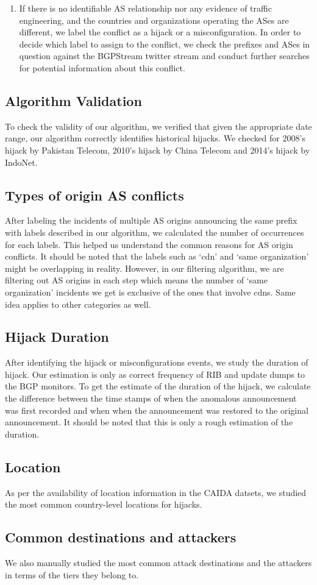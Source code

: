 \begin{enumerate}
\item If there is no identifiable AS relationship nor any evidence of traffic engineering, and the countries and organizations operating the ASes are different, we label the conflict as a hijack or a misconfiguration. In order to decide which label to assign to the conflict, we check the prefixes and ASes in question against the BGPStream twitter stream and conduct further searches for potential information about this conflict.
\end{enumerate}
\subsection{Algorithm Validation}
To check the validity of our algorithm, we verified that given the appropriate date range, our algorithm correctly identifies historical hijacks. We checked for 2008's hijack by Pakistan Telecom, 2010's hijack by China Telecom and 2014's hijack by IndoNet. 
\subsection{Types of origin AS conflicts}
After labeling the incidents of multiple AS origins announcing the same prefix with labels described in our algorithm, we calculated the number of occurrences for each labels. This helped us understand the common reasons for AS origin conflicts. It should be noted that the labels such as `cdn' and `same organization' might be overlapping in reality. However, in our filtering algorithm, we are filtering out AS origins in each step which means the number of `same organization' incidents we get is exclusive of the ones that involve cdns. Same idea applies to other categories as well.
\subsection{Hijack Duration}
After identifying the hijack or misconfigurations events, we study the duration of hijack. Our estimation is only as correct frequency of RIB and update dumps to the BGP monitors. To get the estimate of the duration of the hijack, we calculate the difference between the time stamps of when the anomalous announcement was first recorded and when when the announcement was restored to the original announcement. It should be noted that this is only a rough estimation of the duration. 
\subsection{Location}
As per the availability of location information in the CAIDA datsets, we studied the most common country-level locations for hijacks. 
\subsection{Common destinations and attackers}
We also manually studied the most common attack destinations and the attackers in terms of the tiers they belong to. 